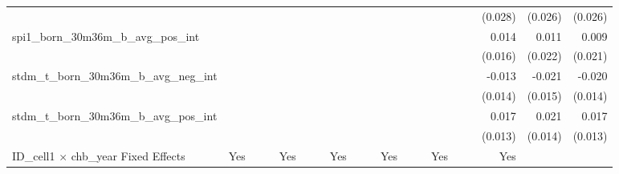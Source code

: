 \begin{tabular}{lrrrrrrrrrrrrrrrrrr}
                                            &              &              &              &              &              &              &              &              &               &              &              &               &              &              &               &      (0.028) &      (0.026) &       (0.026) \\ 
spi1\_born\_30m36m\_b\_avg\_pos\_int        &              &              &              &              &              &              &              &              &               &              &              &               &              &              &               &        0.014 &        0.011 &         0.009 \\ 
                                            &              &              &              &              &              &              &              &              &               &              &              &               &              &              &               &      (0.016) &      (0.022) &       (0.021) \\ 
stdm\_t\_born\_30m36m\_b\_avg\_neg\_int     &              &              &              &              &              &              &              &              &               &              &              &               &              &              &               &       -0.013 &       -0.021 &        -0.020 \\ 
                                            &              &              &              &              &              &              &              &              &               &              &              &               &              &              &               &      (0.014) &      (0.015) &       (0.014) \\ 
stdm\_t\_born\_30m36m\_b\_avg\_pos\_int     &              &              &              &              &              &              &              &              &               &              &              &               &              &              &               &        0.017 &        0.021 &         0.017 \\ 
                                            &              &              &              &              &              &              &              &              &               &              &              &               &              &              &               &      (0.013) &      (0.014) &       (0.013) \\ 
\midrule
ID\_cell1 $\times$ chb\_year Fixed Effects  &          Yes &              &              &          Yes &              &              &          Yes &              &               &          Yes &              &               &          Yes &              &               &          Yes &              &               \\ 

\end{tabular}
